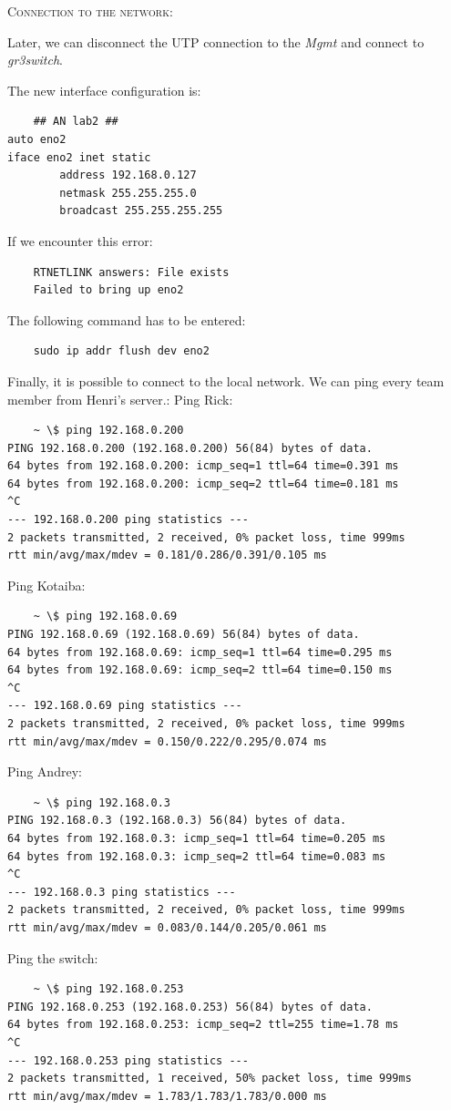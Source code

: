\documentclass{article}
\begin{document}
\textsc{\large Connection to the network:}

Later, we can disconnect the UTP connection to the \textit{Mgmt} and connect to \textit{gr3switch}.

The new interface configuration is:
\begin{verbatim}
    ## AN lab2 ##
auto eno2
iface eno2 inet static
        address 192.168.0.127
        netmask 255.255.255.0
        broadcast 255.255.255.255
\end{verbatim}

If we encounter this error:
\begin{verbatim}
    RTNETLINK answers: File exists 
    Failed to bring up eno2
\end{verbatim}

The following command has to be entered:
\begin{verbatim}
    sudo ip addr flush dev eno2
\end{verbatim}

Finally, it is possible to connect to the local network. We can ping every team member from Henri's server.:
Ping Rick:
\begin{verbatim}
    ~ \$ ping 192.168.0.200
PING 192.168.0.200 (192.168.0.200) 56(84) bytes of data.
64 bytes from 192.168.0.200: icmp_seq=1 ttl=64 time=0.391 ms
64 bytes from 192.168.0.200: icmp_seq=2 ttl=64 time=0.181 ms
^C
--- 192.168.0.200 ping statistics ---
2 packets transmitted, 2 received, 0% packet loss, time 999ms
rtt min/avg/max/mdev = 0.181/0.286/0.391/0.105 ms
\end{verbatim}
Ping Kotaiba:
\begin{verbatim}
    ~ \$ ping 192.168.0.69
PING 192.168.0.69 (192.168.0.69) 56(84) bytes of data.
64 bytes from 192.168.0.69: icmp_seq=1 ttl=64 time=0.295 ms
64 bytes from 192.168.0.69: icmp_seq=2 ttl=64 time=0.150 ms
^C
--- 192.168.0.69 ping statistics ---
2 packets transmitted, 2 received, 0% packet loss, time 999ms
rtt min/avg/max/mdev = 0.150/0.222/0.295/0.074 ms
\end{verbatim}
Ping Andrey:
\begin{verbatim}
    ~ \$ ping 192.168.0.3
PING 192.168.0.3 (192.168.0.3) 56(84) bytes of data.
64 bytes from 192.168.0.3: icmp_seq=1 ttl=64 time=0.205 ms
64 bytes from 192.168.0.3: icmp_seq=2 ttl=64 time=0.083 ms
^C
--- 192.168.0.3 ping statistics ---
2 packets transmitted, 2 received, 0% packet loss, time 999ms
rtt min/avg/max/mdev = 0.083/0.144/0.205/0.061 ms
\end{verbatim}
Ping the switch:
\begin{verbatim}
    ~ \$ ping 192.168.0.253
PING 192.168.0.253 (192.168.0.253) 56(84) bytes of data.
64 bytes from 192.168.0.253: icmp_seq=2 ttl=255 time=1.78 ms
^C
--- 192.168.0.253 ping statistics ---
2 packets transmitted, 1 received, 50% packet loss, time 999ms
rtt min/avg/max/mdev = 1.783/1.783/1.783/0.000 ms
\end{verbatim}
\end{document}
